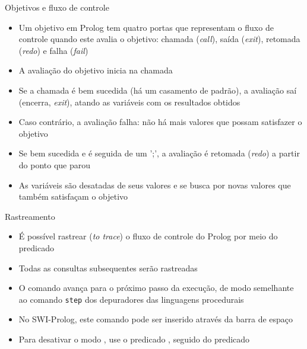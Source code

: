 \begin{frame}[fragile]{Objetivos e fluxo de controle}

    \begin{itemize}
        \item Um objetivo em Prolog tem quatro portas que representam o fluxo de controle
            quando este avalia o objetivo: chamada 
            (\textit{call}), saída (\textit{exit}), retomada (\textit{redo}) e falha 
            (\textit{fail})

        \item A avaliação do objetivo inicia na chamada

        \item Se a chamada é bem sucedida (há um casamento de padrão), a avaliação saí 
            (encerra, \textit{exit}), atando as variáveis com os resultados obtidos

        \item Caso contrário, a avaliação falha: não há mais valores que possam satisfazer o 
            objetivo

        \item Se bem sucedida e é seguida de um ';', a avaliação é retomada (\textit{redo}) a
            partir do ponto que parou 

        \item As variáveis são desatadas de seus valores e se busca por novas valores que 
            também satisfaçam o objetivo
    \end{itemize}

\end{frame}



\begin{frame}[fragile]{Rastreamento}

    \begin{itemize}
        \item É possível rastrear (\textit{to trace}) o fluxo de controle do Prolog por meio
            do predicado 

        \item Todas as consultas subsequentes serão rastreadas

        \item O comando  avança para o próximo passo da execução, de modo
            semelhante ao comando \texttt{step} dos depuradores das linguagens procedurais

        \item No SWI-Prolog, este comando pode ser inserido através da barra de espaço

        \item Para desativar o modo , use o predicado 
            , seguido do predicado 

    \end{itemize}

\end{frame}


